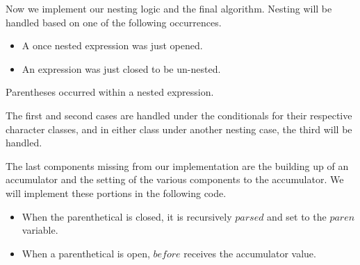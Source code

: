 Now we implement our nesting logic and the final algorithm. Nesting will be handled 
based on one of the following occurrences.

\begin{itemize}
  \item A once nested expression was just opened.
  \item An expression was just closed to be un-nested.
\end{itemize}
 Parentheses occurred within a nested expression.

The first and second cases are handled under the conditionals for their respective 
character classes, and in either class under another nesting case, the third will be 
handled.

The last components missing from our implementation are the building up of an 
accumulator and the setting of the various components to the accumulator. We will 
implement these portions in the following code.

\begin{itemize}
  \item When the parenthetical is closed, it is recursively $parsed$ and set to the $paren$ variable.
  \item When a parenthetical is open, $before$ receives the accumulator value.
\end{itemize}

